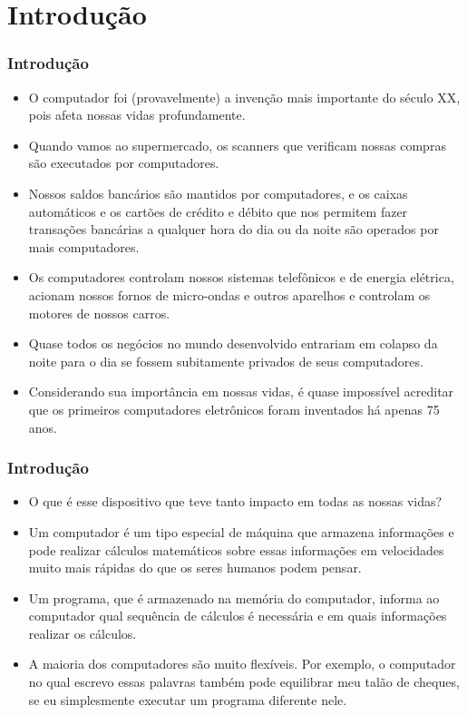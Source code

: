 \section{Introdução}
\begin{frame}
\frametitle{Introdução}
\begin{itemize}
  \item O computador foi (provavelmente) a invenção mais importante do século XX, pois afeta nossas vidas profundamente.
  \item Quando vamos ao supermercado, os scanners que verificam nossas compras são executados por computadores. 
  \item Nossos saldos bancários são mantidos por computadores, e os caixas automáticos e os cartões de crédito e débito que nos permitem fazer transações bancárias a qualquer hora do dia ou da noite são operados por mais computadores. 
  \item Os computadores controlam nossos sistemas telefônicos e de energia elétrica, acionam nossos fornos de micro-ondas e outros aparelhos e controlam os motores de nossos carros. 
  \item Quase todos os negócios no mundo desenvolvido entrariam em colapso da noite para o dia se fossem subitamente privados de seus computadores. 
  \item Considerando sua importância em nossas vidas, é quase impossível acreditar que os primeiros computadores eletrônicos foram inventados há apenas 75 anos.
  \end{itemize}
\end{frame}
\begin{frame}
\frametitle{Introdução}
  \begin{itemize}
  \item O que é esse dispositivo que teve tanto impacto em todas as nossas vidas? 
  \item Um computador é um tipo especial de máquina que armazena informações e pode realizar cálculos matemáticos sobre essas informações em velocidades muito mais rápidas do que os seres humanos podem pensar. 
  \item Um programa, que é armazenado na memória do computador, informa ao computador qual sequência de cálculos é necessária e em quais informações realizar os cálculos. 
  \item A maioria dos computadores são muito flexíveis. Por exemplo, o computador no qual escrevo essas palavras também pode equilibrar meu talão de cheques, se eu simplesmente executar um programa diferente nele.
  \end{itemize}
\end{frame}
